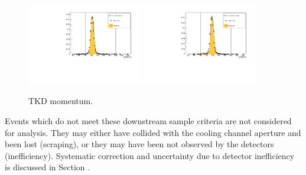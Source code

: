 \begin{figure}[!tbh]
    \includegraphics*[width=0.45\textwidth]{02-Cuts/Figures/2017-2.7_10-140_lH2_full/tkd_p_ds_cut.pdf}
    \includegraphics*[width=0.45\textwidth]{02-Cuts/Figures/2017-2.7_10-140_lH2_empty/tkd_p_ds_cut.pdf}
    \caption{TKD momentum.
\label{fig:tkd_mom}}
\end{figure}


Events which do not meet these downstream sample criteria are not considered
for analysis. They may either have collided with the cooling channel aperture 
and been lost (scraping), or 
they may have been not observed by the detectors (inefficiency). Systematic 
correction and uncertainty due to detector inefficiency is discussed in Section 
\cite{sec:inefficiency}.
